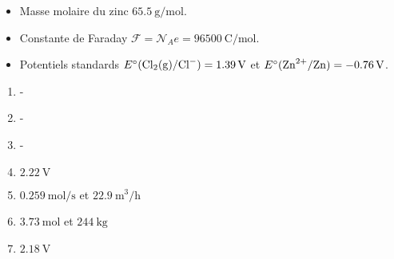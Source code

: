 \begin{itemize}
	\item Masse molaire du zinc $\SI{65.5}{\gram\per\mole}$.
	\item Constante de Faraday $\mathcal{F} = \mathcal{N}_A e = \SI{96500}{\coulomb\per\mole}$.
	\item Potentiels standards $E^\circ(\ce{Cl2(g)}/\ce{Cl-}) = \SI{1.39}{\volt}$ et  $E^\circ(\ce{Zn^2+}/\ce{Zn}) = \SI{-0.76}{\volt}$.
\end{itemize}

\begin{enumerate}
	\item -
	\item -
	\item -
	\item $\SI{2.22}{\volt}$
	\item $\SI{0.259}{\mol\per\second}$ et $\SI{22.9}{\cubic\meter\per\hour}$
	\item $\SI{3.73}{\mole}$ et $\SI{244}{\kilogram}$
	\item $\SI{2.18}{\volt}$
\end{enumerate}